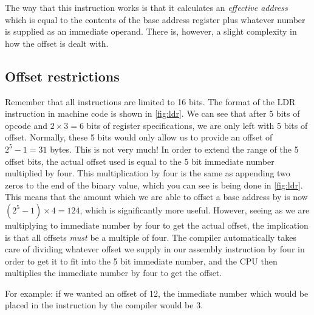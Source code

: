 The way that this instruction works is that it calculates an \emph{effective address} which is equal to the contents of the base address register plus whatever number is supplied as an immediate operand.
There is, however, a slight complexity in how the offset is dealt with.

\subsection{Offset restrictions}
Remember that all instructions are limited to 16 bits. The format of the LDR instruction in machine code is shown in \autoref{fig:ldr}. We can see that after 5 bits of opcode and $2 \times 3 = 6$ bits of register specifications, we are only left with 5 bits of offset. Normally, these 5 bits would only allow us to provide an offset of $2^5 - 1 = 31$ bytes. This is not very much! In order to extend the range of the 5 offset bits, the actual offset used is equal to the 5 bit immediate number multiplied by four. This multiplication by four is the same as appending two zeros to the end of the binary value, which you can see is being done in \autoref{fig:ldr}. This means that the amount which we are able to offset a base address by is now $(2^5 - 1) \times 4 = 124$, which is significantly more useful. However, seeing as we are multiplying to immediate number by four to get the actual offset, the implication is that all offsets \emph{must} be a multiple of four. 
The compiler automatically takes care of dividing whatever offset we supply in our assembly instruction by four in order to get it to fit into the 5 bit immediate number, and the CPU then multiplies the immediate number by four to get the offset.

For example: if we wanted an offset of 12, the immediate number which would be placed in the instruction by the compiler would be 3.

